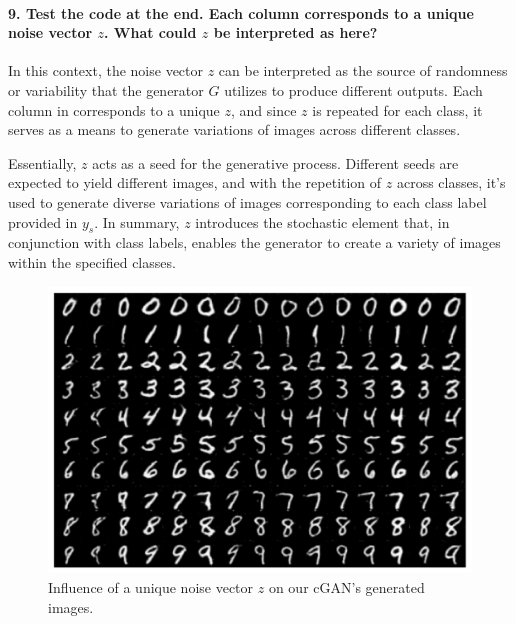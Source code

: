 \paragraph*{9. Test the code at the end. Each column corresponds to a unique noise vector $z$. What could $z$ be interpreted as here?}

In this context, the noise vector $z$ can be interpreted as the source of randomness or variability that the generator $G$ utilizes to produce different outputs. Each column in  corresponds to a unique $z$, and since $z$ is repeated for each class, it serves as a means to generate variations of images across different classes.

Essentially, $z$ acts as a seed for the generative process. Different seeds are expected to yield different images, and with the repetition of $z$ across classes, it's used to generate diverse variations of images corresponding to each class label provided in $y_s$. In summary, $z$ introduces the stochastic element that, in conjunction with class labels, enables the generator to create a variety of images within the specified classes.

\begin{figure}[H]
    \centering
    \includegraphics[width=.8\textwidth]{impact_of_z}
    \caption{Influence of a unique noise vector $z$ on our cGAN's generated images.}
    \label{fig:impact_of_z}
\end{figure}